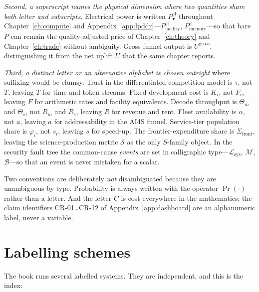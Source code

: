 \emph{Second, a superscript names the physical dimension where two quantities share both letter and subscripts.} Electrical power is written $P^{\mathrm{el}}_{\bullet}$ throughout Chapter~\ref{ch:compute} and Appendix~\ref{app:lpddr}---$P^{\mathrm{el}}_{\text{facility}}$, $P^{\mathrm{el}}_{\mathrm{memory}}$---so that bare $P$ can remain the quality-adjusted price of Chapter~\ref{ch:theory} and Chapter~\ref{ch:trade} without ambiguity. Gross funnel output is $U^{\mathrm{gross}}$, distinguishing it from the net uplift $U$ that the same chapter reports.

\emph{Third, a distinct letter or an alternative alphabet is chosen outright} where suffixing would be clumsy. Trust in the differentiated-competition model is $\tau$, not $T$, leaving $T$ for time and token streams. Fixed development cost is $K_i$, not $F_i$, leaving $F$ for arithmetic rates and facility equivalents. Decode throughput is $\Theta_m$ and $\Theta_s$, not $R_m$ and $R_s$, leaving $R$ for revenue and rent. Fleet availability is $\alpha$, not $a$, leaving $a$ for addressability in the AI4S funnel. Service-tier population share is $\varphi_i$, not $s_i$, leaving $s$ for speed-up. The frontier-expenditure share is $\Sigma_{\mathrm{front}}$, leaving the science-production metric $\boldsymbol{\mathcal{S}}$ as the only $S$-family object. In the security fault tree the common-cause \emph{events} are set in calligraphic type---$\mathcal{L}_{\mathrm{sys}}$, $\mathcal{M}$, $\mathcal{B}$---so that an event is never mistaken for a scalar.

Two conventions are deliberately \emph{not} disambiguated because they are unambiguous by type. Probability is always written with the operator $\Pr(\cdot)$ rather than a letter. And the letter $C$ is cost everywhere in the mathematics; the claim identifiers CR-01\dots CR-12 of Appendix~\ref{app:dashboard} are an alphanumeric label, never a variable.

\section*{Labelling schemes}

The book runs several labelled systems. They are independent, and this is the index:

